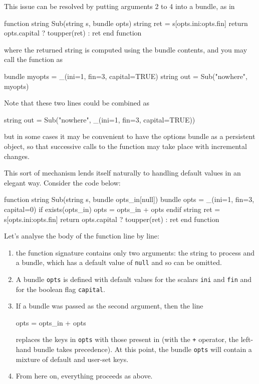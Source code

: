 This issue can be resolved by putting arguments 2 to 4 into a bundle, as in
\begin{code}
function string Sub(string s, bundle opts)
    string ret = s[opts.ini:opts.fin]
    return opts.capital ? toupper(ret) : ret
end function
\end{code}
where the returned string is computed using the bundle contents, and you may
call the function as
\begin{code}
  bundle myopts = _(ini=1, fin=3, capital=TRUE)
  string out = Sub("nowhere", myopts)
\end{code}
Note that these two lines could be combined as
\begin{code}
  string out = Sub("nowhere", _(ini=1, fin=3, capital=TRUE))
\end{code}
but in some cases it may be convenient to have the options bundle as a
persistent object, so that successive calls to the function may take
place with incremental changes.

This sort of mechanism lends itself naturally to handling default values in
an elegant way. Consider the code below:
\begin{code}
function string Sub(string s, bundle opts_in[null])
    bundle opts = _(ini=1, fin=3, capital=0)
    if exists(opts_in)
        opts = opts_in + opts
    endif
    string ret = s[opts.ini:opts.fin]
    return opts.capital ? toupper(ret) : ret
end function
\end{code}
Let's analyse the body of the function line by line:
\begin{enumerate}
\item the function signature contains only two arguments: the string
  to process and a bundle, which has a default value of \texttt{null}
  and so can be omitted.
\item A bundle \texttt{opts} is defined with default values for the scalars
  \texttt{ini} and \texttt{fin} and for the boolean flag \texttt{capital}.
\item If a bundle was passed as the second argument, then the line
  \begin{code}
     opts = opts_in + opts
  \end{code}
  replaces the keys in \texttt{opts} with those present in
   (with the \texttt{+} operator, the left-hand
  bundle takes precedence). At this point, the bundle \texttt{opts}
  will contain a mixture of default and user-set keys.
\item From here on, everything proceeds as above.
\end{enumerate}

